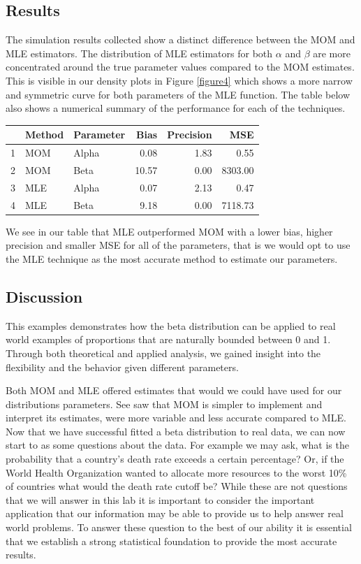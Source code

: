 \documentclass{article}\usepackage[]{graphicx}\usepackage[]{xcolor}
\begin{document}
\begin{multicols}{2}
\subsection{Results}
The simulation results collected show a distinct difference between the MOM and MLE estimators. The distribution of MLE estimators for both $\alpha$ and $\beta$ are more concentrated around the true parameter values compared to the MOM estimates. This is visible in our density plots in Figure \ref{figure4} which shows a more narrow and symmetric curve for both parameters of the MLE function. The table below also shows a numerical summary of the performance for each of the techniques. 
\begin{center}
\small
{}
\label{table3}
\begin{tabular}{rllrrr}
  \hline
 & Method & Parameter & Bias & Precision & MSE \\ 
  \hline
1 & MOM & Alpha & 0.08 & 1.83 & 0.55 \\ 
2 & MOM & Beta & 10.57 & 0.00 & 8303.00 \\ 
3 & MLE & Alpha & 0.07 & 2.13 & 0.47 \\ 
4 & MLE & Beta & 9.18 & 0.00 & 7118.73 \\ 
  \hline
\end{tabular}
\end{center}

We see in our table that MLE outperformed MOM with a lower bias, higher precision and smaller MSE for all of the parameters, that is we would opt to use the MLE technique as the most accurate method to estimate our parameters. 

\subsection{Discussion}
This examples demonstrates how the beta distribution can be applied to real world examples of proportions that are naturally bounded between 0 and 1. Through both theoretical and applied analysis, we gained insight into the flexibility and the behavior given different parameters. 

Both MOM and MLE offered estimates that would we could have used for our distributions parameters. See saw that MOM is simpler to implement and interpret its estimates, were more variable and less accurate compared to MLE. Now that we have successful fitted a beta distribution to real data, we can now start to as some questions about the data. For example we may ask, what is the probability that a country's death rate exceeds a certain percentage? Or, if the World Health Organization wanted to allocate more resources to the worst 10\% of countries what would the death rate cutoff be? While these are not questions that we will answer in this lab it is important to consider the important application that our information may be able to provide us to help answer real world problems. To answer these question to the best of our ability it is essential that we establish a strong statistical foundation to provide the most accurate results. 




\end{multicols}
\end{document}
